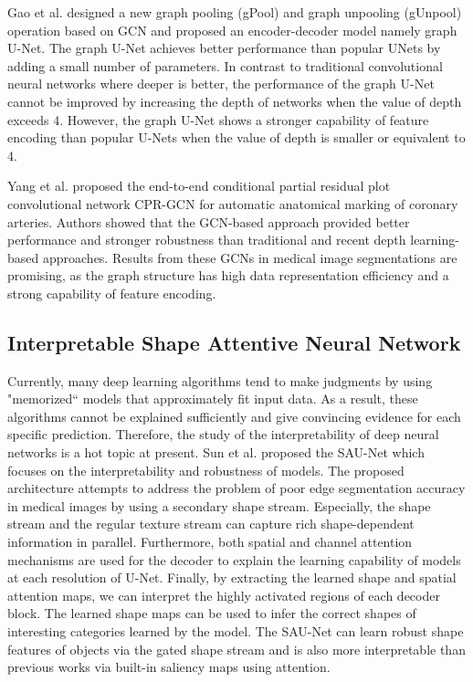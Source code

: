Gao et al. designed a new graph pooling (gPool) and graph unpooling (gUnpool)
operation based on GCN and proposed an encoder-decoder model namely graph U-Net.
The graph U-Net achieves better performance than popular UNets by adding a small
number of parameters. In contrast to traditional convolutional neural networks
where deeper is better, the performance of the graph U-Net cannot be improved by
increasing the depth of networks when the value of depth exceeds 4. However, the
graph U-Net shows a stronger capability of feature encoding than popular U-Nets
when the value of depth is smaller or equivalent to 4.

Yang et al. proposed the end-to-end conditional partial residual plot
convolutional network CPR-GCN for automatic anatomical marking of coronary
arteries. Authors showed that the GCN-based approach provided better performance
and stronger robustness than traditional and recent depth learning-based
approaches. Results from these GCNs in medical image segmentations are
promising, as the graph structure has high data representation efficiency and
a strong capability of feature encoding.

\subsection{Interpretable Shape Attentive Neural Network}
Currently, many deep learning algorithms tend to make judgments by using
"memorized`` models that approximately fit input data. As a result, these
algorithms cannot be explained sufficiently and give convincing evidence for
each specific prediction. Therefore, the study of the interpretability of deep
neural networks is a hot topic at present. Sun et al. proposed the SAU-Net which
focuses on the interpretability and robustness of models. The proposed
architecture attempts to address the problem of poor edge segmentation accuracy
in medical images by using a secondary shape stream. Especially, the shape stream
and the regular texture stream can capture rich shape-dependent information in
parallel. Furthermore, both spatial and channel attention mechanisms are used for
the decoder to explain the learning capability of models at each resolution of
U-Net. Finally, by extracting the learned shape and spatial attention maps, we
can interpret the highly activated regions of each decoder block. The learned
shape maps can be used to infer the correct shapes of interesting categories learned
by the model. The SAU-Net can learn robust shape features of objects via
the gated shape stream and is also more interpretable than previous works via
built-in saliency maps using attention.

